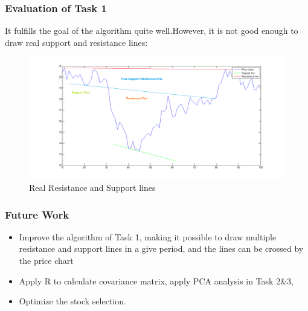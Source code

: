 \documentclass[compress,handout,10pt]{beamer}
\let\olditem\item
\renewcommand{\item}{\setlength{\itemsep}{0.5\baselineskip}\olditem}
\begin{document}
\begin{frame}
    \frametitle{Evaluation of Task 1}
It fulfills the goal of the algorithm quite well.However, it is not good enough to draw real support and resistance lines:
\begin{figure}[h]
    \begin{center}
        \includegraphics[width=\textwidth]{images/4.png}
    \end{center}
    \caption{Real Resistance and Support lines}
    \label{fig:rs}
\end{figure}  
\end{frame}


\begin{frame}
    \frametitle{Future Work}
\begin {itemize}
\item Improve the algorithm of Task 1, making it possible to draw multiple resistance and support lines in a give period, and the lines can be crossed by the price chart
\item Apply R to calculate covariance matrix, apply PCA analysis in Task 2\&3,
\item Optimize the stock selection.
\end{itemize}
\end{frame}
\end{document}
